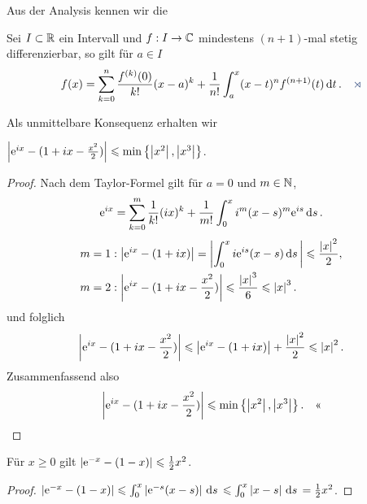 Aus der Analysis kennen wir die

\begin{propn}
Sei $I\subset\mathbb{R}$ ein Intervall und $f: I\to \mathbb{C}$ mindestens $(n+1)$-mal stetig
differenzierbar, so gilt für $a\in I$
\begin{align*}
f(x) = \sum_{k=0}^n \frac{f^{(k)}(0)}{k!}(x-a)^k + \frac{1}{n!}\int_a^x (x-t)^n
f^{(n+1)}(t)\dt.\fishhere
\end{align*}
\end{propn}

Als unmittelbare Konsequenz erhalten wir
\begin{lemn}[Hilfsformel 1]
$\left|\mathrm{e}^{ix}-(1+ix-\frac{x^2}{2})\right| \leqslant \min\left\{ \left|x^2\right|,\left|x^3\right| \right\}$.\fishhere
\end{lemn}
\begin{proof}
Nach dem Taylor-Formel gilt für $a=0$ und $m\in\mathbb{N}$,
\begin{align*}
\mathrm{e}^{ix} = \sum_{k=0}^m \frac{1}{k!}(ix)^k + \frac{1}{m!}\int_0^x i^m
(x-s)^m\mathrm{e}^{is}\,\mathrm{d} s\,.
\end{align*}
\begin{align*}
&m=1: \left|\mathrm{e}^{ix}-(1+ix)\right| = \left|\int_0^x i\mathrm{e}^{is}(x-s)\,\mathrm{d} s\,\right| \leqslant
\frac{\left|x\right|^2}{2},\\ &m=2: \left|\mathrm{e}^{ix}-(1+ix-\frac{x^2}{2})\right| \leqslant \frac{\left|x\right|^3}{6} \leqslant \left|x\right|^3.
\end{align*}
und folglich
\begin{align*}
\left|\mathrm{e}^{ix}-(1+ix-\frac{x^2}{2})\right|
\leqslant \left|\mathrm{e}^{ix}-(1+ix)\right|+\frac{\left|x\right|^2}{2} \leqslant \left|x\right|^2.
\end{align*}
Zusammenfassend also
\begin{align*}
\left|\mathrm{e}^{ix}-(1+ix-\frac{x^2}{2})\right| \leqslant \min\left\{ \left|x^2\right|,\left|x^3\right| \right\}.\quad\text{<<}
\end{align*}
\end{proof}
\begin{lemn}[Hilfsformel 2]
Für $x\ge 0$ gilt $\left|\mathrm{e}^{-x}-(1-x)\right| \leqslant \frac{1}{2}x^2$.\fishhere
\end{lemn}
\begin{proof}
$\left|\mathrm{e}^{-x}-(1-x)\right| \leqslant \int_0^x \left|\mathrm{e}^{-s}(x-s)\right|\,\mathrm{d} s\, \leqslant \int_0^x \left|x-s\right|\,\mathrm{d} s\,
= \frac{1}{2}x^2$.\qedhere
\end{proof}

